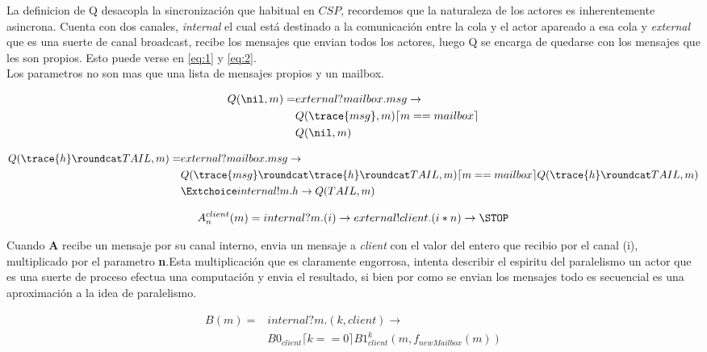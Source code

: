 \documentclass{article}
\begin{document}
La definicion de Q desacopla la sincronización que habitual en $CSP$, recordemos que la naturaleza de los actores es inherentemente asincrona.  Cuenta con dos canales, \textit{internal} el cual está destinado a la comunicación entre la cola y el actor apareado a esa cola y \textit{external} que es una suerte de canal broadcast, recibe los mensajes que envian todos los actores, luego Q se encarga de quedarse con los mensajes que les son propios. Esto puede verse en \ref{eq:1} y \ref{eq:2}.\\
Los parametros no son mas que una lista de mensajes propios y un mailbox.

\begin{align}
Q(\nil, m) = & external?mailbox.msg \rightarrow \nonumber  \\
& Q(\trace{msg}, m) \lceil m == mailbox \rceil \label{eq:1} \\
& Q(\nil, m) \nonumber 
\end{align}


\begin{align}
  Q(\trace{h} \roundcat TAIL, m) = & external?mailbox.msg \rightarrow \nonumber \\
  & Q(\trace{msg} \roundcat \trace{h} \roundcat TAIL, m) \lceil m == mailbox \rceil Q(\trace{h} \roundcat TAIL, m)  \label{eq:2} \\
  & \Extchoice internal!m.h \rightarrow Q(TAIL, m) \nonumber 
\end{align}

  
\begin{align}
  A_{n}^{client}(m) = internal?m.(i) \rightarrow external!client.(i*n) \rightarrow \STOP \label{eq:3}
\end{align}

Cuando \textbf{A} recibe un mensaje por su canal interno, envia un mensaje a \textit{client} con el valor del entero que recibio por el canal (i), multiplicado por el parametro \textbf{n}.Esta multiplicación que es claramente engorrosa, intenta describir el espiritu del paralelismo un actor que es una suerte de proceso efectua una computación y envia el resultado, si bien por como se envian los mensajes todo es secuencial es una aproximación a la idea de paralelismo. 

\begin{align}
  B(m) = & internal?m.(k,client) \rightarrow \nonumber \\
& B0_{client} \lceil k == 0 \rceil B1_{client}^{k}(m, f_{newMailbox}(m)) \label{eq:4}
\end{align}
\end{document}
